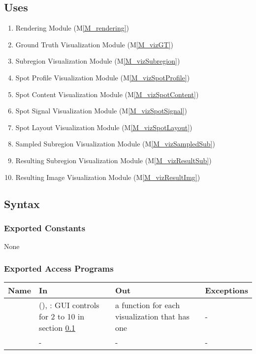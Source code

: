 \documentclass[12pt, titlepage]{article}
\newcommand{\mref}[1]{M\ref{#1}}
\newcommand{\mrefp}[1]{(\mref{#1})}
\newcommand{\mreff}[1]{Module \mrefp{#1}}
\begin{document}
\subsection{Uses} \label{USES_dispControl}
\begin{enumerate}
  \item Rendering \mreff{M_rendering}
  \item Ground Truth Visualization \mreff{M_vizGT}
  \item Subregion Visualization \mreff{M_vizSubregion}
  \item Spot Profile Visualization \mreff{M_vizSpotProfile}
  \item Spot Content Visualization \mreff{M_vizSpotContent}
  \item Spot Signal Visualization \mreff{M_vizSpotSignal}
  \item Spot Layout Visualization \mreff{M_vizSpotLayout}
  \item Sampled Subregion Visualization \mreff{M_vizSampledSub}
  \item Resulting Subregion Visualization \mreff{M_vizResultSub}
  \item Resulting Image Visualization \mreff{M_vizResultImg}
\end{enumerate}

\subsection{Syntax}

\subsubsection{Exported Constants}
None

\subsubsection{Exported Access Programs}

\begin{center}
\begin{tabular}{L{3cm} L{5cm} L{4cm} L{2cm}}
\hline
\textbf{Name} & \textbf{In} & \textbf{Out} & \textbf{Exceptions} \\
\hline
{} &  (),
  : GUI controls for 2 to 10 in section \ref{USES_dispControl}
  & a  function for each visualization that has one & - \\
\hline
{} & - & - & - \\
\hline
\end{tabular}
\end{center}
\end{document}
